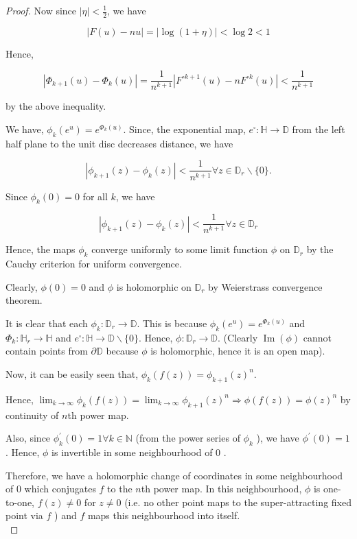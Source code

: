 \begin{proof}
Now since $|\eta|<\frac{1}{2}$, we have

$$
|F(u)-n u|=|\log (1+\eta)|<\log 2<1
$$

Hence,

$$
\left|\Phi_{k+1}(u)-\Phi_{k}(u)\right|=\frac{1}{n^{k+1}}\left|F^{\circ k+1}(u)-n F^{\circ k}(u)\right|<\frac{1}{n^{k+1}}
$$

by the above inequality.

We have, $\phi_{k}\left(e^{u}\right)=e^{\Phi_{k}(u)}$. Since, the exponential map, $e^{\square}: \mathbb{H} \rightarrow \mathbb{D}$ from the left half plane to the unit disc decreases distance, we have

$$
\left|\phi_{k+1}(z)-\phi_{k}(z)\right|<\frac{1}{n^{k+1}} \forall z \in \mathbb{D}_{r} \backslash\{0\} .
$$

Since $\phi_{k}(0)=0$ for all $k$, we have

$$
\left|\phi_{k+1}(z)-\phi_{k}(z)\right|<\frac{1}{n^{k+1}} \forall z \in \mathbb{D}_{r}
$$

Hence, the maps $\phi_{k}$ converge uniformly to some limit function $\phi$ on $\mathbb{D}_{r}$ by the Cauchy criterion for uniform convergence.

Clearly, $\phi(0)=0$ and $\phi$ is holomorphic on $\mathbb{D}_{r}$ by Weierstrass convergence theorem.

It is clear that each $\phi_{k}: \mathbb{D}_{r} \rightarrow \mathbb{D}$. This is because $\phi_{k}\left(e^{u}\right)=e^{\Phi_{k}(u)}$ and $\Phi_{k}: \mathbb{H}_{r} \rightarrow \mathbb{H}$ and $e^{\square}: \mathbb{H} \rightarrow \mathbb{D} \backslash\{0\}$. Hence, $\phi: \mathbb{D}_{r} \rightarrow \mathbb{D}$. (Clearly $\operatorname{Im}(\phi)$ cannot contain points from $\partial \mathbb{D}$ because $\phi$ is holomorphic, hence it is an open map).

Now, it can be easily seen that, $\phi_{k}(f(z))=\phi_{k+1}(z)^{n}$.

Hence, $\lim _{k \rightarrow \infty} \phi_{k}(f(z))=\lim _{k \rightarrow \infty} \phi_{k+1}(z)^{n} \Longrightarrow \phi(f(z))=\phi(z)^{n}$ by continuity of $n$th power map.

Also, since $\phi_{k}^{\prime}(0)=1 \forall k \in \mathbb{N}$ (from the power series of $\phi_{k}$ ), we have $\phi^{\prime}(0)=1$. Hence, $\phi$ is invertible in some neighbourhood of 0 .

Therefore, we have a holomorphic change of coordinates in some neighbourhood of 0 which conjugates $f$ to the $n$th power map. In this neighbourhood, $\phi$ is one-to-one, $f(z) \neq 0$ for $z \neq 0$ (i.e. no other point maps to the super-attracting fixed point via $f$ ) and $f$ maps this neighbourhood into itself.\\
\vspace{1pt}


\end{proof}
